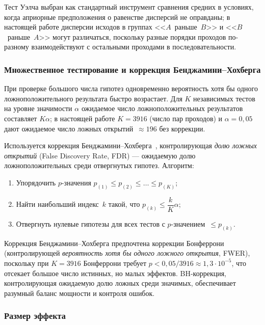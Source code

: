 Тест Уэлча выбран как стандартный инструмент сравнения средних в условиях, когда априорные предположения о равенстве дисперсий не оправданы; в настоящей работе дисперсии исходов в группах <<$A$~раньше~$B$>> и <<$B$~раньше~$A$>> могут различаться, поскольку разные порядки проходов по-разному взаимодействуют с остальными проходами в последовательности.

\subsubsection{Множественное тестирование и коррекция Бенджамини--Хохберга}

При проверке большого числа гипотез одновременно вероятность хотя бы одного ложноположительного результата быстро возрастает. Для $K$ независимых тестов на уровне значимости $\alpha$ ожидаемое число ложноположительных результатов составляет $K \alpha$; в настоящей работе $K = 3916$ (число пар проходов) и $\alpha = 0{,}05$ дают ожидаемое число ложных открытий~$\approx 196$ без коррекции.

Используется коррекция Бенджамини--Хохберга~\cite{benjamini1995controlling}, контролирующая \emph{долю ложных открытий} (False Discovery Rate, FDR) --- ожидаемую долю ложноположительных среди отвергнутых гипотез. Алгоритм:

\begin{enumerate}
    \item Упорядочить $p$-значения $p_{(1)} \leqslant p_{(2)} \leqslant \dots \leqslant p_{(K)}$;
    \item Найти наибольший индекс~$k$ такой, что $p_{(k)} \leqslant \dfrac{k}{K} \alpha$;
    \item Отвергнуть нулевые гипотезы для всех тестов с $p$-значением~$\leqslant p_{(k)}$.
\end{enumerate}

Коррекция Бенджамини--Хохберга предпочтена коррекции Бонферрони (контролирующей \emph{вероятность хотя бы одного ложного открытия}, FWER), поскольку при $K = 3916$ Бонферрони требует $p < 0{,}05/3916 \approx 1{,}3 \cdot 10^{-5}$, что отсекает большое число истинных, но малых эффектов. BH-коррекция, контролирующая ожидаемую долю ложных среди значимых, обеспечивает разумный баланс мощности и контроля ошибок.

\subsubsection{Размер эффекта}

